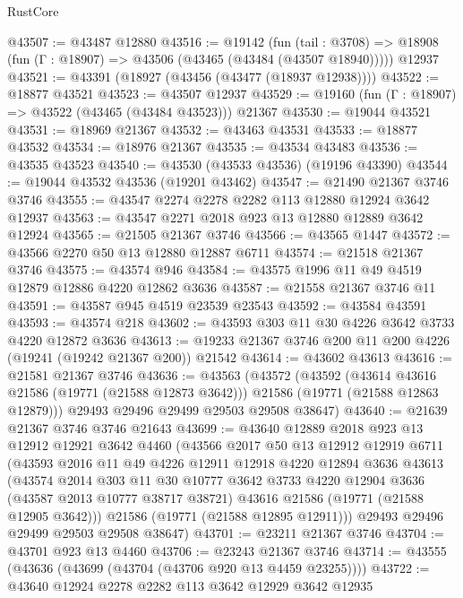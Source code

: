 \begin{lexlean}{RustCore}
\begin{coremodule}
@43507 := @43487 @12880
@43516 := @19142
    (fun (tail : @3708) => @18908 (fun (Γ : @18907) => @43506 (@43465 (@43484 (@43507 @18940)))))
    @12937
@43521 := @43391 (@18927 (@43456 (@43477 (@18937 @12938))))
@43522 := @18877 @43521
@43523 := @43507 @12937
@43529 := @19160 (fun (Γ : @18907) => @43522 (@43465 (@43484 @43523))) @21367
@43530 := @19044 @43521
@43531 := @18969 @21367
@43532 := @43463 @43531
@43533 := @18877 @43532
@43534 := @18976 @21367
@43535 := @43534 @43483
@43536 := @43535 @43523
@43540 := @43530 (@43533 @43536) (@19196 @43390)
@43544 := @19044 @43532 @43536 (@19201 @43462)
@43547 := @21490 @21367 @3746 @3746
@43555 := @43547 @2274 @2278 @2282 @113 @12880 @12924 @3642 @12937
@43563 := @43547 @2271 @2018 @923 @13 @12880 @12889 @3642 @12924
@43565 := @21505 @21367 @3746
@43566 := @43565 @1447
@43572 := @43566 @2270 @50 @13 @12880 @12887 @6711
@43574 := @21518 @21367 @3746
@43575 := @43574 @946
@43584 := @43575 @1996 @11 @49 @4519 @12879 @12886 @4220 @12862 @3636
@43587 := @21558 @21367 @3746 @11
@43591 := @43587 @945 @4519 @23539 @23543
@43592 := @43584 @43591
@43593 := @43574 @218
@43602 := @43593 @303 @11 @30 @4226 @3642 @3733 @4220 @12872 @3636
@43613 := @19233 @21367 @3746 @200 @11 @200 @4226 (@19241 (@19242 @21367 @200)) @21542
@43614 := @43602 @43613
@43616 := @21581 @21367 @3746
@43636 := @43563
    (@43572
      (@43592
        (@43614 @43616 @21586 (@19771 (@21588 @12873 @3642)))
        @21586
        (@19771 (@21588 @12863 @12879)))
      @29493
      @29496
      @29499
      @29503
      @29508
      @38647)
@43640 := @21639 @21367 @3746 @3746 @21643
@43699 := @43640
    @12889
    @2018
    @923
    @13
    @12912
    @12921
    @3642
    @4460
    (@43566
      @2017
      @50
      @13
      @12912
      @12919
      @6711
      (@43593
        @2016
        @11
        @49
        @4226
        @12911
        @12918
        @4220
        @12894
        @3636
        @43613
        (@43574
          @2014
          @303
          @11
          @30
          @10777
          @3642
          @3733
          @4220
          @12904
          @3636
          (@43587 @2013 @10777 @38717 @38721)
          @43616
          @21586
          (@19771 (@21588 @12905 @3642)))
        @21586
        (@19771 (@21588 @12895 @12911)))
      @29493
      @29496
      @29499
      @29503
      @29508
      @38647)
@43701 := @23211 @21367 @3746
@43704 := @43701 @923 @13 @4460
@43706 := @23243 @21367 @3746
@43714 := @43555 (@43636 (@43699 (@43704 (@43706 @920 @13 @4459 @23255))))
@43722 := @43640 @12924 @2278 @2282 @113 @3642 @12929 @3642 @12935

\end{coremodule}
\end{lexlean}
